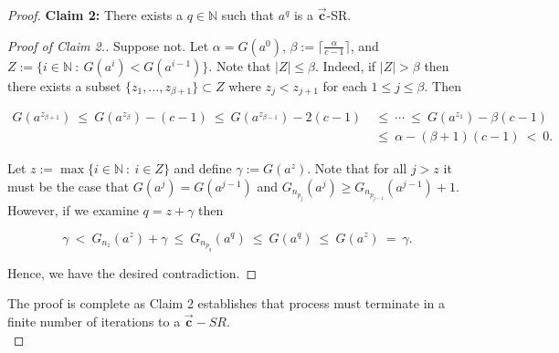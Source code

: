 \documentclass[10pt,a4paper]{amsart}
\newcommand{\N}{{\mathbb N}}  %
\newcommand{\vtr}[1]{\vec{\mathbf{#1}}}
\begin{document}
\begin{proof}
\noindent \textbf{Claim 2:} There exists a $q\in \N$ such that $a^{q}$ is a $\vtr{c}$-SR.

\begin{proof}[Proof of Claim 2.]
    Suppose not. Let $\alpha=G(a^0)$, $\beta:=\lceil\frac{\alpha}{c-1}\rceil$, and $Z:=\{i\in \N\ :\ G(a^{i})<G(a^{i-1})\}$. Note that $|Z|\leq \beta$. Indeed, if $|Z|> \beta$ then there exists a subset $\{z_1,\ldots,z_{\beta+1}\}\subset Z$ where $z_{j}<z_{j+1}$ for each $1\leq j\leq \beta$. Then

    \begin{align*}
        G(a^{z_{\beta+1}})\ \leq\ G(a^{z_{\beta}})-(c-1)\ \leq\ G(a^{z_{\beta-1}})-2(c-1)\ &\leq\ \cdots\ \leq\ G(a^{z_1})-\beta(c-1)\\
        &\leq\ \alpha-(\beta+1)(c-1)\ <\ 0.
    \end{align*}

    Let $z:=\max\{i\in \N\ :\ i\in Z\}$ and define $\gamma:=G(a^{z})$. Note that for all $j>z$ it must be the case that $G(a^{j})=G(a^{j-1})$ and $G_{n_{p_j}}(a^j)\geq G_{n_{p_{j-1}}}(a^{j-1})+1$. However, if we examine $q=z+\gamma$ then

    $$\gamma\ <\ G_{n_{z}}(a^z)+\gamma\ \leq\ G_{n_{p_{q}}}(a^{q})\ \leq\  G(a^q)\ \leq\  G(a^z)\ =\ \gamma. $$

    Hence, we have the desired contradiction.
    
\end{proof}
The proof is complete as Claim 2 establishes that process must terminate in a finite number of iterations to a $\vtr{c}-SR$.\\
\end{proof}
\end{document}
